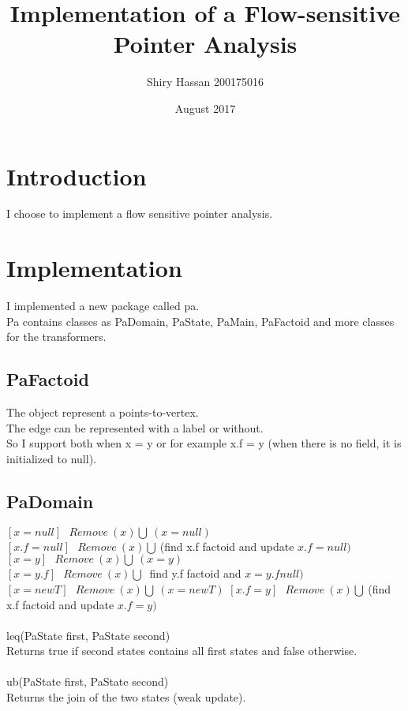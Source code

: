 \documentclass{article}
\title{Implementation of a Flow-sensitive Pointer Analysis}
\author{Shiry Hassan  200175016}
\date{August 2017}
\begin{document}
\maketitle

\section{Introduction} I choose to implement a flow sensitive pointer analysis.

\section{Implementation} I implemented a new package called pa.\\
Pa contains classes as PaDomain, PaState, PaMain, PaFactoid and more classes for the transformers.

\subsection{PaFactoid} The object represent a points-to-vertex.\\
The edge can be represented with a label or without.\\
So I support both when x = y or for example x.f = y (when there is no field, it is initialized to null).

\subsection{PaDomain}
$[x = null] \ \ \ Remove \ (x) \bigcup \ (x = null)$\\
$[x.f = null]\ \ \ Remove \ (x) \bigcup \ $(find x.f factoid and update $x.f= null)$\\
$[x = y]\ \ \ Remove \ (x) \bigcup \ (x = y)$\\
$[x = y.f]\ \ \ Remove \ (x) \bigcup \ $ find y.f factoid and $x = y.f null)$\\
$[x = new T]\ \ \ Remove \ (x) \bigcup \ (x =  new T)$
$[x.f = y]\ \ \ Remove \ (x) \bigcup \ $(find x.f factoid and update $x.f= y)$\\\\
leq(PaState first, PaState second)\\
Returns true if second states contains all first states and false otherwise.\\\\
ub(PaState first, PaState second)\\
Returns the join of the two states (weak update). 
\end{document}
